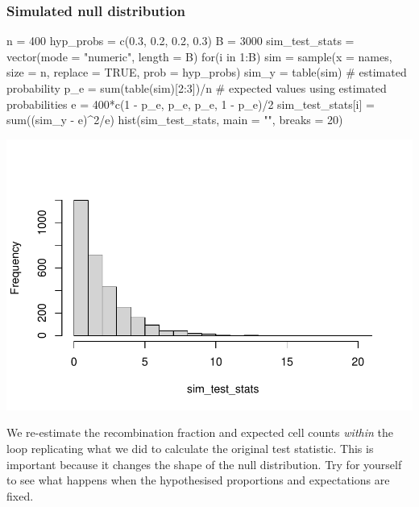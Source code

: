 \documentclass[a4paper]{article}
\begin{document}
\subsubsection{Simulated null distribution}
\begin{Schunk}
\begin{Sinput}
n = 400
hyp_probs = c(0.3, 0.2, 0.2, 0.3)
B = 3000
sim_test_stats = vector(mode = "numeric", length = B)
for(i in 1:B){
  sim = sample(x = names, size = n, replace = TRUE, prob = hyp_probs)
  sim_y = table(sim)
  # estimated probability
  p_e = sum(table(sim)[2:3])/n
  # expected values using estimated probabilities
  e = 400*c(1 - p_e, p_e, p_e, 1 - p_e)/2
  sim_test_stats[i] = sum((sim_y - e)^2/e)
}
hist(sim_test_stats, main = "", breaks = 20)
\end{Sinput}


{\centering \includegraphics[width=\maxwidth]{figure/listings-unnamed-chunk-27-1} 

}

\end{Schunk}
\begin{goldbox}
	We re-estimate the recombination fraction and expected cell counts \textit{within} the loop replicating what we did to calculate the original test statistic. This is important because it changes the shape of the null distribution. Try for yourself to see what happens when the hypothesised proportions and expectations are fixed.
\end{goldbox}
\end{document}
